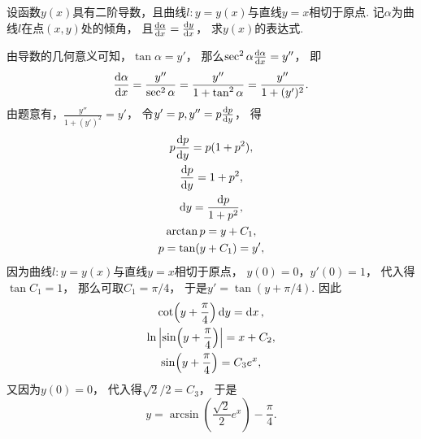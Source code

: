 \begin{example}
设函数\(y(x)\)具有二阶导数，且曲线\(l: y=y(x)\)与直线\(y=x\)相切于原点.
记\(\alpha\)为曲线\(l\)在点\((x,y)\)处的倾角，
且\(\dv{\alpha}{x}=\dv{y}{x}\)，
求\(y(x)\)的表达式.
\begin{solution}
由导数的几何意义可知，\(\tan\alpha=y'\)，
那么\(\sec^2\alpha \dv{\alpha}{x} = y''\)，
即\[
	\dv{\alpha}{x} = \frac{y''}{\sec^2\alpha}
	= \frac{y''}{1+\tan^2\alpha}
	= \frac{y''}{1+(y')^2}.
\]
由题意有，\(\frac{y''}{1+(y')^2} = y'\)，
令\(y' = p,
y'' = p\dv{p}{y}\)，
得\begin{gather*}
	p\dv{p}{y} = p(1+p^2), \\
	\dv{p}{y} = 1+p^2, \\
	\dd{y} = \frac{\dd{p}}{1+p^2}, \\
	\arctan p = y + C_1, \\
	p = \tan(y+C_1) = y',
\end{gather*}
因为曲线\(l: y=y(x)\)与直线\(y=x\)相切于原点，
\(y(0) = 0\)，\(y'(0) = 1\)，
代入得\(\tan C_1 = 1\)，
那么可取\(C_1 = \pi/4\)，
于是\(y' = \tan(y+\pi/4)\).
因此\begin{gather*}
	\cot(y+\frac{\pi}{4}) \dd{y} = \dd{x}, \\
	\ln\abs{\sin(y+\frac{\pi}{4})} = x + C_2, \\
	\sin(y+\frac{\pi}{4}) = C_3 e^x,
\end{gather*}
又因为\(y(0) = 0\)，
代入得\(\sqrt{2}/2 = C_3\)，
于是\[
	y = \arcsin(\frac{\sqrt{2}}{2} e^x) - \frac{\pi}{4}.
\]
\end{solution}
\end{example}
